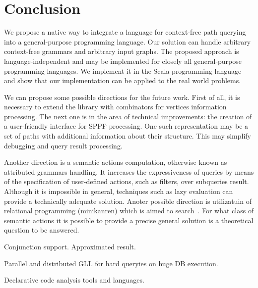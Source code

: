 \section{Conclusion}

We propose a native way to integrate a language for context-free path querying into a general-purpose programming language.
Our solution can handle arbitrary context-free grammars and arbitrary input graphs.
The proposed approach is language-independent and may be implemented for closely all general-purpose programming languages.
We implement it in the Scala programming language and show that our implementation can be applied to the real world problems.

We can propose some possible directions for the future work.
First of all, it is necessary to extend the library with combinators for vertices information processing.
The next one is in the area of technical improvements: the creation of a user-friendly interface for SPPF processing.
One such representation may be a set of paths with additional information about their structure.
This may simplify debugging and query result processing.

Another direction is a semantic actions computation, otherwise known as attributed grammars handling.
It increases the expressiveness of queries by means of the specification of user-defined actions, such as filters, over subqueries result. 
Although it is impossible in general, techniques such as lazy evaluation can provide a technically adequate solution.
Anoter possible direction is utilizatuin of relational programming (minikanren) which is aimed to search~\cite{DB}.
For what class of semantic actions it is possible to provide a precise general solution is a theoretical question to be answered. 

Conjunction support. Approximated result.

Parallel and distributed GLL for hard queryies on huge DB execution.

Declarative code analysis tools and languages.